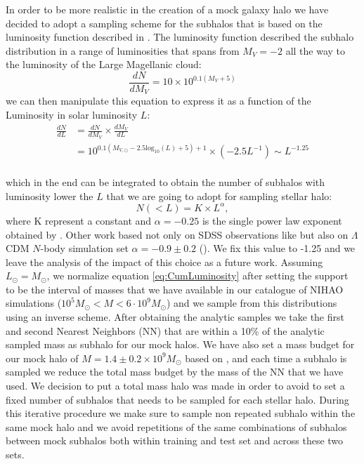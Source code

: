 In order to be more realistic in the creation of a mock galaxy halo we have decided to adopt a sampling scheme for the subhalos that is based on the luminosity function described in \cite{koposovLuminosityFunctionMilky2008}. The luminosity function described the subhalo distribution in a range of luminosities that spans from $M_V = -2$ all the way to the luminosity of the Large Magellanic cloud:
\begin{equation}
    \frac{dN}{d M_V} = 10 \times 10^{0.1(M_V + 5)} 
\end{equation}
we can then manipulate this equation to express it as a function of the Luminosity in solar luminosity $L$:
\begin{equation}
\begin{split}
    \frac{dN}{dL} &= \frac{dN}{d M_V} \times \frac{dM_V}{dL} \\
    &= 10^{0.1(M_{V, \odot} - 2.5\text{log}_{10} (L) +5) +1} \times (-2.5 L^{-1}) \sim L^{-1.25}\\
\end{split}
\end{equation}

which in the end can be integrated to obtain the number of subhalos with luminosity lower the $L$ that we are going to adopt for sampling stellar halo:
\begin{equation}
    N(<L) = K \times L^{\alpha},
\label{eq:CumLuminosity}
\end{equation}
where K represent a constant and $\alpha=-0.25$ is the single power law exponent obtained by \cite{koposovLuminosityFunctionMilky2008}. Other work based not only on SDSS observations like \cite{koposovLuminosityFunctionMilky2008} but also on $\Lambda$CDM $N$-body simulation set $\alpha = -0.9 \pm 0.2$ (\cite{tollerudHundredsMilkyWay2008}). We fix this value to -1.25 and we leave the analysis of the impact of this choice as a future work.
Assuming $L_\odot = M_\odot$, we normalize equation \ref{eq:CumLuminosity} after setting the support to be the interval of masses that we have available in our catalogue of NIHAO simulations ($10^5 M_\odot < M < 6 \cdot 10^9 M_\odot$) and we sample from this distributions using an inverse scheme. After obtaining the analytic samples we take the first and second Nearest Neighbors (NN) that are within a  
10\% of the analytic sampled mass as subhalo for our mock halos. We have also set a mass budget for our mock halo of $M=1.4 \pm 0.2 \times 10^9 M_\odot$ based on \cite{deasonTotalStellarHalo2019}, and each time a subhalo is sampled we reduce the total mass budget by the mass of the NN that we have used. We decision to put a total mass halo was made in order to avoid to set a fixed number of subhalos that needs to be sampled for each stellar halo. During this iterative procedure we make sure to sample non repeated subhalo within the same mock halo and we avoid repetitions of the same combinations of subhalos between mock subhalos both within training and test set and across these two sets.

